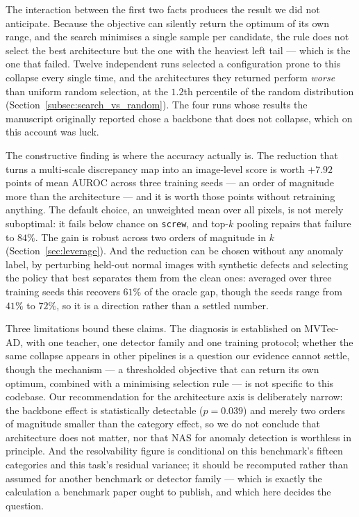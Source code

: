 The interaction between the first two facts produces the result we did not
anticipate. Because the objective can silently return the optimum of its own
range, and the search minimises a single sample per candidate, the rule does not
select the best architecture but the one with the heaviest left tail --- which is
the one that failed. Twelve independent runs selected a configuration prone to
this collapse every single time, and the architectures they returned perform
\emph{worse} than uniform random selection, at the $1.2$th percentile of the
random distribution (Section~\ref{subsec:search_vs_random}). The four runs whose
results the manuscript originally reported chose a backbone that does not
collapse, which on this account was luck.

The constructive finding is where the accuracy actually is. The reduction that
turns a multi-scale discrepancy map into an image-level score is worth $+7.92$
points of mean AUROC across three training seeds --- an order of magnitude more
than the architecture --- and it is worth those points without retraining
anything. The default choice, an unweighted mean over all pixels, is not merely
suboptimal: it fails below chance on \texttt{screw}, and top-$k$ pooling repairs
that failure to $84\%$. The gain is robust across two orders of magnitude in $k$
(Section~\ref{sec:leverage}). And the reduction can be chosen without any anomaly
label, by perturbing held-out normal images with synthetic defects and selecting
the policy that best separates them from the clean ones: averaged over three
training seeds this recovers $61\%$ of the oracle gap, though the seeds range from
$41\%$ to $72\%$, so it is a direction rather than a settled number.

Three limitations bound these claims. The diagnosis is established on MVTec-AD,
with one teacher, one detector family and one training protocol; whether the same
collapse appears in other pipelines is a question our evidence cannot settle,
though the mechanism --- a thresholded objective that can return its own optimum,
combined with a minimising selection rule --- is not specific to this codebase.
Our recommendation for the architecture axis is deliberately narrow: the backbone
effect is statistically detectable ($p = 0.039$) and merely two orders of
magnitude smaller than the category effect, so we do not conclude that
architecture does not matter, nor that NAS for anomaly detection is worthless in
principle. And the resolvability figure is conditional on this benchmark's fifteen
categories and this task's residual variance; it should be recomputed rather than
assumed for another benchmark or detector family --- which is exactly the
calculation a benchmark paper ought to publish, and which here decides the
question.

